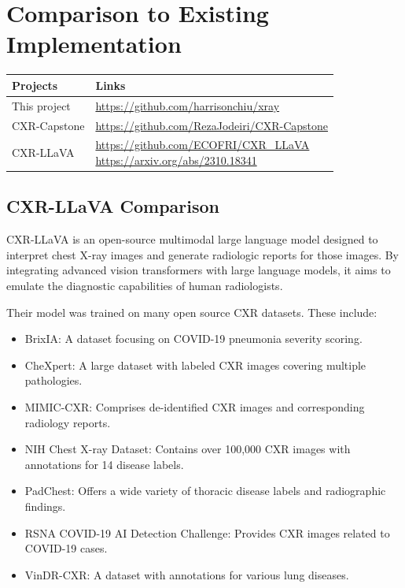 \documentclass[12pt, titlepage]{article}
\begin{document}
	
\section{Comparison to Existing Implementation}	

\begin{table}[]
  \centering
  \begin{tabular}{|l|l|}
  \hline
  \textbf{Projects} & \textbf{Links} \\ \hline
  This project & \url{https://github.com/harrisonchiu/xray} \\ \hline
  CXR-Capstone & \url{https://github.com/RezaJodeiri/CXR-Capstone} \\ \hline
  CXR-LLaVA & 
  \makecell{\url{https://github.com/ECOFRI/CXR\_LLaVA} \\ \url{https://arxiv.org/abs/2310.18341}} \\ \hline
  \end{tabular}
\end{table}

\subsection{CXR-LLaVA Comparison}
CXR-LLaVA is an open-source multimodal large language model designed to interpret chest X-ray images and generate radiologic reports for those images. By integrating advanced vision transformers with large language models, it aims to emulate the diagnostic capabilities of human radiologists.

Their model was trained on many open source CXR datasets. These include:
\begin{itemize}
\item BrixIA: A dataset focusing on COVID-19 pneumonia severity scoring.
\item CheXpert: A large dataset with labeled CXR images covering multiple pathologies.
\item MIMIC-CXR: Comprises de-identified CXR images and corresponding radiology reports.
\item NIH Chest X-ray Dataset: Contains over 100,000 CXR images with annotations for 14 disease labels.
\item PadChest: Offers a wide variety of thoracic disease labels and radiographic findings.
\item RSNA COVID-19 AI Detection Challenge: Provides CXR images related to COVID-19 cases.
\item VinDR-CXR: A dataset with annotations for various lung diseases.
\end{itemize}
\end{document}
